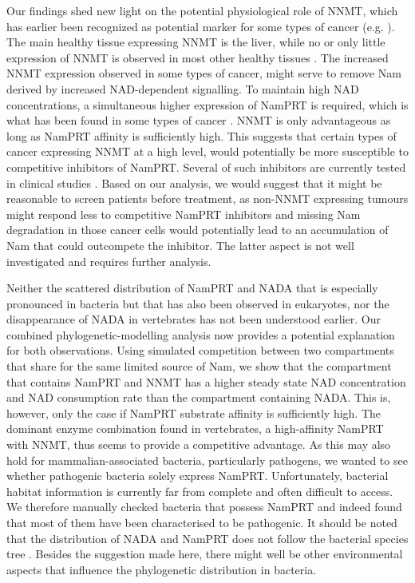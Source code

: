 Our findings shed new light on the potential physiological role of NNMT, which has earlier been recognized as potential marker for some types of cancer (e.g. \cite{Okamura1998}). The main healthy tissue expressing NNMT is the liver, while no or only little expression of NNMT is observed in most other healthy tissues \cite{Aksoy1994}. The increased NNMT expression observed in some types of cancer, might serve to remove Nam derived by increased NAD-dependent signalling. To maintain high NAD concentrations, a simultaneous higher expression of NamPRT is required, which is what has been found in some types of cancer \cite{Bi2011,Wang2011}. NNMT is only advantageous as long as NamPRT affinity is sufficiently high. This suggests that certain types of cancer expressing NNMT at a high level, would potentially be more susceptible to competitive inhibitors of NamPRT. Several of such inhibitors are currently tested in clinical studies \cite{EspindolaNetto2017,Xu2015SR}. Based on our analysis, we would suggest that it might be reasonable to screen patients before treatment, as non-NNMT expressing tumours might respond less to competitive NamPRT inhibitors and missing Nam degradation in those cancer cells would potentially lead to an accumulation of Nam that could outcompete the inhibitor. The latter aspect is not well investigated and requires further analysis.

Neither the scattered distribution of NamPRT and NADA that is especially pronounced in bacteria \cite{Gazzaniga2009} but that has also been observed in eukaryotes, nor the disappearance of NADA in vertebrates has not been understood earlier. Our combined phylogenetic-modelling analysis now provides a potential explanation for both observations. Using simulated competition between two compartments that share for the same limited source of Nam, we show that the compartment that contains NamPRT and NNMT has a higher steady state NAD concentration and NAD consumption rate than the compartment containing NADA. This is, however, only the case if NamPRT substrate affinity is sufficiently high. The dominant enzyme combination found in vertebrates, a high-affinity NamPRT with NNMT, thus seems to provide a competitive advantage. As this may also hold for mammalian-associated bacteria, particularly pathogens, we wanted to see whether pathogenic bacteria solely express NamPRT. Unfortunately, bacterial habitat information is currently far from complete and often difficult to access. We therefore manually checked bacteria that possess NamPRT and indeed found that most of them have been characterised to be pathogenic. It should be noted that the distribution of NADA and NamPRT does not follow the bacterial species tree \cite{Gazzaniga2009}. Besides the suggestion made here, there might well be other environmental aspects that influence the phylogenetic distribution in bacteria.

